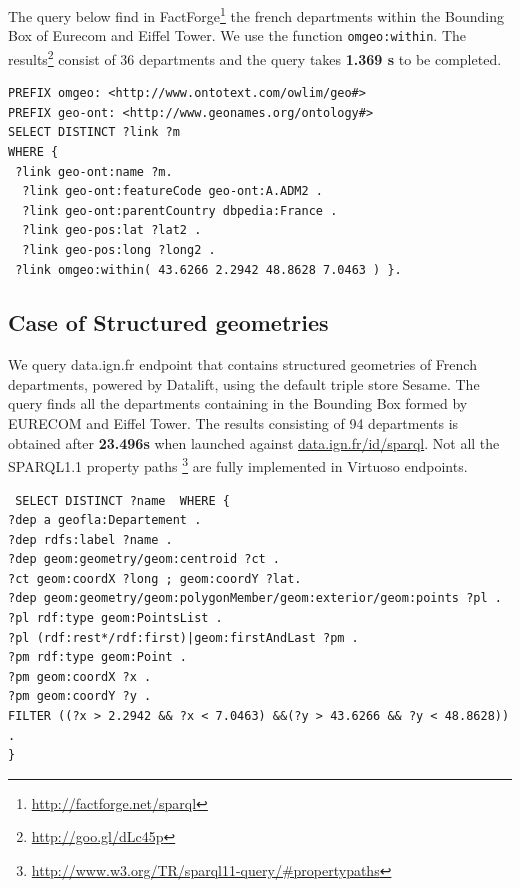 The query below find in FactForge\footnote{\url{http://factforge.net/sparql}} the french departments within the Bounding Box of Eurecom and Eiffel Tower. We use the function \texttt{omgeo:within}. The results\footnote{\url{http://goo.gl/dLc45p}} consist of 36 departments and the query takes \textbf{1.369 s} to be completed.  
\begin{verbatim}
PREFIX omgeo: <http://www.ontotext.com/owlim/geo#>
PREFIX geo-ont: <http://www.geonames.org/ontology#>
SELECT DISTINCT ?link ?m
WHERE {
 ?link geo-ont:name ?m.
  ?link geo-ont:featureCode geo-ont:A.ADM2 .
  ?link geo-ont:parentCountry dbpedia:France .
  ?link geo-pos:lat ?lat2 .
  ?link geo-pos:long ?long2 .
 ?link omgeo:within( 43.6266 2.2942 48.8628 7.0463 ) }.

\end{verbatim}


\subsection{Case of Structured geometries}
\label{sec:ignsparql}
 We query data.ign.fr endpoint that contains structured geometries of French departments, powered by Datalift, using the default triple store Sesame. The query finds all the departments containing in the Bounding Box formed by EURECOM and Eiffel Tower. The results consisting of 94 departments is obtained after \textbf{23.496s} when launched against \url{data.ign.fr/id/sparql}. Not all the SPARQL1.1 property paths \footnote{\url{http://www.w3.org/TR/sparql11-query/\#propertypaths}} are fully implemented in Virtuoso endpoints. 
 
 
 \begin{verbatim}
 SELECT DISTINCT ?name  WHERE {
?dep a geofla:Departement .
?dep rdfs:label ?name .
?dep geom:geometry/geom:centroid ?ct .
?ct geom:coordX ?long ; geom:coordY ?lat.
?dep geom:geometry/geom:polygonMember/geom:exterior/geom:points ?pl .
?pl rdf:type geom:PointsList .
?pl (rdf:rest*/rdf:first)|geom:firstAndLast ?pm .
?pm rdf:type geom:Point .
?pm geom:coordX ?x .
?pm geom:coordY ?y .
FILTER ((?x > 2.2942 && ?x < 7.0463) &&(?y > 43.6266 && ?y < 48.8628)) .
} 
 \end{verbatim}
 


